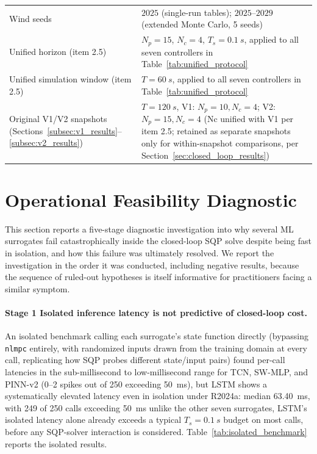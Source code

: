 \begin{table}[H]
\begin{tabularx}{\textwidth}{
			>{\raggedright\arraybackslash}p{4cm}
			>{\raggedright\arraybackslash}X
		}
		Wind seeds
		& $2025$ (single-run tables); $2025$--$2029$ (extended Monte Carlo,
		5 seeds) \\
		
		Unified horizon (item 2.5)
		& $N_p=15$, $N_c=4$, $T_s=\SI{0.1}{s}$, applied to all seven
		controllers in Table~\ref{tab:unified_protocol} \\
		
		Unified simulation window (item 2.5)
		& $T=\SI{60}{s}$, applied to all seven controllers in
		Table~\ref{tab:unified_protocol} \\
		
		Original V1/V2 snapshots (Sections~\ref{subsec:v1_results}--\ref{subsec:v2_results})
		& $T=\SI{120}{s}$, V1: $N_p=10,N_c=4$; V2: $N_p=15,N_c=4$ (Nc
		unified with V1 per item 2.5; retained as separate snapshots
		only for within-snapshot comparisons, per
		Section~\ref{sec:closed_loop_results}) \\
		
		\bottomrule
	\end{tabularx}
\end{table}

\section{Operational Feasibility Diagnostic}
\label{subsec:operational_feasibility}

This section reports a five-stage diagnostic investigation into why
several ML surrogates fail catastrophically inside the closed-loop SQP
solve despite being fast in isolation, and how this failure was
ultimately resolved. We report the investigation in the order it was
conducted, including negative results, because the sequence of ruled-out
hypotheses is itself informative for practitioners facing a similar
symptom.

\paragraph{Stage 1  Isolated inference latency is not predictive of
closed-loop cost.} An isolated benchmark calling each surrogate's state
function directly (bypassing \texttt{nlmpc} entirely, with randomized
inputs drawn from the training domain at every call, replicating how
SQP probes different state/input pairs) found per-call latencies in the
sub-millisecond to low-millisecond range for TCN, SW-MLP, and PINN-v2
(0--2 spikes out of 250 exceeding \SI{50}{ms}), but LSTM shows a
systematically elevated latency even in isolation under R2024a: median
\SI{63.40}{ms}, with 249 of 250 calls exceeding \SI{50}{ms}  unlike the
other seven surrogates, LSTM's isolated latency alone already exceeds a
typical $T_s=\SI{0.1}{s}$ budget on most calls, before any SQP-solver
interaction is considered. Table~\ref{tab:isolated_benchmark} reports the
isolated results.

